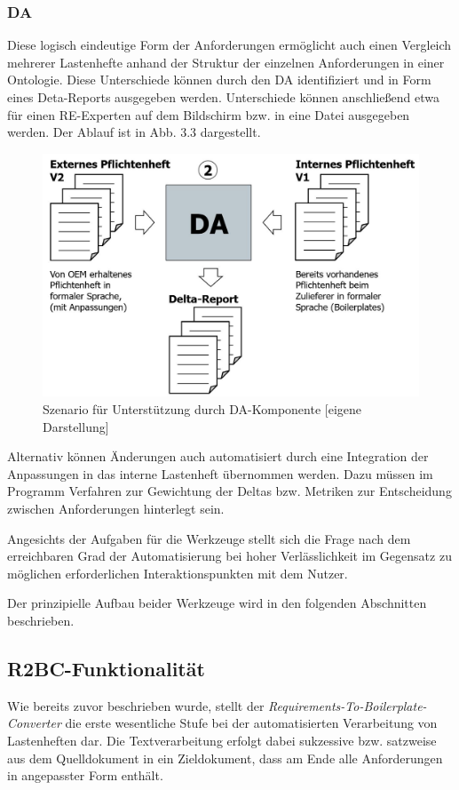 \documentclass[12pt]{report}
\begin{document}
\subsubsection{DA}
Diese logisch eindeutige Form der Anforderungen ermöglicht auch einen Vergleich mehrerer Lastenhefte anhand der Struktur der einzelnen Anforderungen in einer Ontologie. Diese Unterschiede können durch den DA identifiziert und in Form eines Deta-Reports ausgegeben werden. Unterschiede können anschließend etwa für einen RE-Experten auf dem Bildschirm bzw. in eine Datei ausgegeben werden. Der Ablauf ist in Abb. 3.3 dargestellt.
\begin{figure}[h!]
\begin{center}
\includegraphics[scale=0.5]{Bilder/Prozess-DA.jpg}
\caption{Szenario für Unterstützung durch DA-Komponente [eigene Darstellung]}
\end{center}
\end{figure}

Alternativ können Änderungen auch automatisiert durch eine Integration der Anpassungen in das interne Lastenheft übernommen werden. Dazu müssen im Programm Verfahren zur Gewichtung der Deltas bzw. Metriken zur Entscheidung zwischen Anforderungen hinterlegt sein.

Angesichts der Aufgaben für die Werkzeuge stellt sich die Frage nach dem erreichbaren Grad der Automatisierung bei hoher Verlässlichkeit im Gegensatz zu möglichen erforderlichen Interaktionspunkten mit dem Nutzer. 

Der prinzipielle Aufbau beider Werkzeuge wird in den folgenden Abschnitten beschrieben.

\subsection{R2BC-Funktionalität}
Wie bereits zuvor beschrieben wurde, stellt der \textit{Requirements-To-Boilerplate-Converter} die erste wesentliche Stufe bei der automatisierten Verarbeitung von Lastenheften dar. Die Textverarbeitung erfolgt dabei sukzessive bzw. satzweise aus dem Quelldokument in ein Zieldokument, dass am Ende alle Anforderungen in angepasster Form enthält. 
\end{document}
